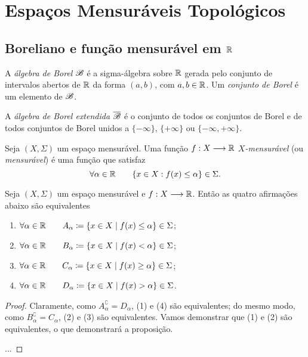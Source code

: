 \clearpage
\section{Espaços Mensuráveis Topológicos}

\subsection{Boreliano e função mensurável em $\mathbb{R}$}

\begin{defi}
	A \emph{álgebra de Borel} $\mathscr{B}$ é a sigma-álgebra sobre $\mathbb{R}$ gerada pelo conjunto de intervalos abertos de $\mathbb{R}$ da forma $(a,b)$, com $a,b \in \mathbb{R}$. Um \emph{conjunto de Borel} é um elemento de $\mathscr{B}$.
\end{defi}

\begin{defi}
	A \emph{álgebra de Borel extendida} $\overline{\mathscr{B}}$ é o conjunto de todos os conjuntos de Borel e de todos conjuntos de Borel unidos a $\{-\infty\}$, $\{+\infty\}$ ou $\{-\infty,+\infty\}$.
\end{defi}

\begin{defi}
	Seja $(X,\Sigma)$ um espaço mensurável. Uma função $f: X \longrightarrow \mathbb{R}$ \emph{$X$-mensurável} (ou \emph{mensurável}) é uma função que satisfaz
	\begin{equation*}
	\forall \alpha \in \mathbb{R} \qquad \{x \in X : f(x) \leq \alpha\} \in \Sigma.
	\end{equation*}
\end{defi}

\begin{prop}
	Seja $(X,\Sigma)$ um espaço mensurável e $f: X \longrightarrow \mathbb{R}$. Então as quatro afirmações abaixo são equivalentes
	\begin{enumerate}
	\item $\forall \alpha \in \mathbb{R} \qquad A_\alpha \coloneqq \left\{x \in X \;\middle\vert\; f(x) \leq \alpha \right\} \in \Sigma$;
	\item $\forall \alpha \in \mathbb{R} \qquad B_\alpha \coloneqq \left\{x \in X \;\middle\vert\; f(x) < \alpha \right\} \in \Sigma$;
	\item $\forall \alpha \in \mathbb{R} \qquad C_\alpha \coloneqq \left\{x \in X \;\middle\vert\; f(x) \geq \alpha \right\} \in \Sigma$;
	\item $\forall \alpha \in \mathbb{R} \qquad D_\alpha \coloneqq \left\{x \in X \;\middle\vert\; f(x) > \alpha \right\} \in \Sigma$.
	\end{enumerate}
\end{prop}
\begin{proof}
	Claramente, como $A_\alpha^\complement = D_\alpha$, (1) e (4) são equivalentes; do mesmo modo, como $B_\alpha^\complement = C_\alpha$, (2) e (3) são equivalentes. Vamos demonstrar que (1) e (2) são equivalentes, o que demonstrará a proposição.
	
	...	
\end{proof}

